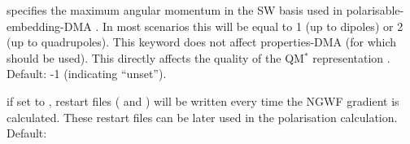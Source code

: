 \documentclass[letterpaper,10pt,english]{sphinxmanual}
\begin{document}
 \textendash{} specifies the maximum angular
momentum in the SW basis used in polarisable-embedding-DMA . In most scenarios this will be equal to 1 (up to
dipoles) or 2 (up to quadrupoles). This keyword does not affect
properties-DMA (for which  should be used). This directly
affects the quality of the QM\(^*\) representation . Default: -1 (indicating “unset”).

 \textendash{} if set to , restart
files ( and ) will
be written every time the NGWF gradient is calculated. These restart
files can be later used in the polarisation calculation. Default: 
\end{document}
